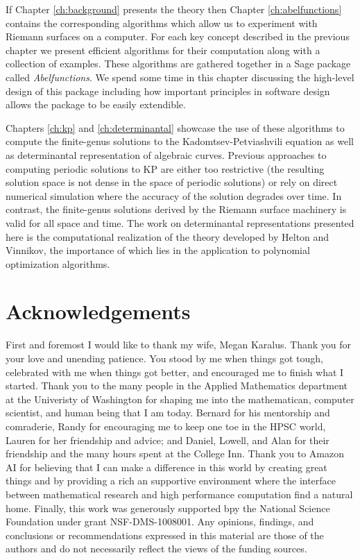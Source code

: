 If Chapter \ref{ch:background} presents the theory then Chapter
\ref{ch:abelfunctions} contains the corresponding algorithms which allow us to
experiment with Riemann surfaces on a computer. For each key concept described
in the previous chapter we present efficient algorithms for their computation
along with a collection of examples. These algorithms are gathered together in a
Sage package called {\it Abelfunctions}. We spend some time in this chapter
discussing the high-level design of this package including how important
principles in software design allows the package to be easily extendible. 

Chapters \ref{ch:kp} and \ref{ch:determinantal} showcase the use of these
algorithms to compute the finite-genus solutions to the Kadomtsev-Petviashvili
equation as well as determinantal representation of algebraic curves. Previous
approaches to computing periodic solutions to KP are either too restrictive (the
resulting solution space is not dense in the space of periodic solutions) or
rely on direct numerical simulation where the accuracy of the solution degrades
over time. In contrast, the finite-genus solutions derived by the Riemann
surface machinery is valid for all space and time. The work on determinantal
representations presented here is the computational realization of the theory
developed by Helton and Vinnikov, the importance of which lies in the
application to polynomial optimization algorithms.

\section{Acknowledgements} \label{sec:acknowledgments}

First and foremost I would like to thank my wife, Megan Karalus. Thank you for
your love and unending patience. You stood by me when things got tough,
celebrated with me when things got better, and encouraged me to finish what I
started. Thank you to the many people in the Applied Mathematics department at
the Univeristy of Washington for shaping me into the mathematican, computer
scientist, and human being that I am today. Bernard for his mentorship and
comraderie, Randy for encouraging me to keep one toe in the HPSC world, Lauren
for her friendship and advice; and Daniel, Lowell, and Alan for their friendship
and the many hours spent at the College Inn. Thank you to Amazon AI for
believing that I can make a difference in this world by creating great things
and by providing a rich an supportive environment where the interface between
mathematical research and high performance computation find a natural home.
Finally, this work was generously supported bpy the National Science Foundation
under grant NSF-DMS-1008001. Any opinions, findings, and conclusions or
recommendations expressed in this material are those of the authors and do not
necessarily reflect the views of the funding sources.

